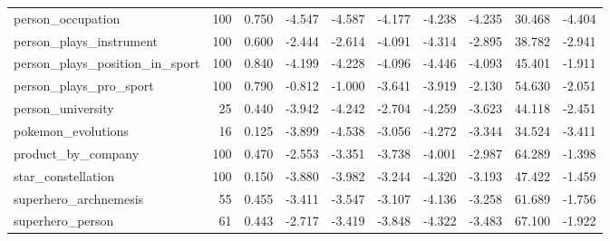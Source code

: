 \begin{table}[htbp]
{\begin{tabular}{lrrrrrrrrr}
person\_occupation & 100 & 0.750 & -4.547 & -4.587 & -4.177 & -4.238 & -4.235 & 30.468 & -4.404 \\
person\_plays\_instrument & 100 & 0.600 & -2.444 & -2.614 & -4.091 & -4.314 & -2.895 & 38.782 & -2.941 \\
person\_plays\_position\_in\_sport & 100 & 0.840 & -4.199 & -4.228 & -4.096 & -4.446 & -4.093 & 45.401 & -1.911 \\
person\_plays\_pro\_sport & 100 & 0.790 & -0.812 & -1.000 & -3.641 & -3.919 & -2.130 & 54.630 & -2.051 \\
person\_university & 25 & 0.440 & -3.942 & -4.242 & -2.704 & -4.259 & -3.623 & 44.118 & -2.451 \\
pokemon\_evolutions & 16 & 0.125 & -3.899 & -4.538 & -3.056 & -4.272 & -3.344 & 34.524 & -3.411 \\
product\_by\_company & 100 & 0.470 & -2.553 & -3.351 & -3.738 & -4.001 & -2.987 & 64.289 & -1.398 \\
star\_constellation & 100 & 0.150 & -3.880 & -3.982 & -3.244 & -4.320 & -3.193 & 47.422 & -1.459 \\
superhero\_archnemesis & 55 & 0.455 & -3.411 & -3.547 & -3.107 & -4.136 & -3.258 & 61.689 & -1.756 \\
superhero\_person & 61 & 0.443 & -2.717 & -3.419 & -3.848 & -4.322 & -3.483 & 67.100 & -1.922 \\
\bottomrule
\end{tabular}}
\end{table}

